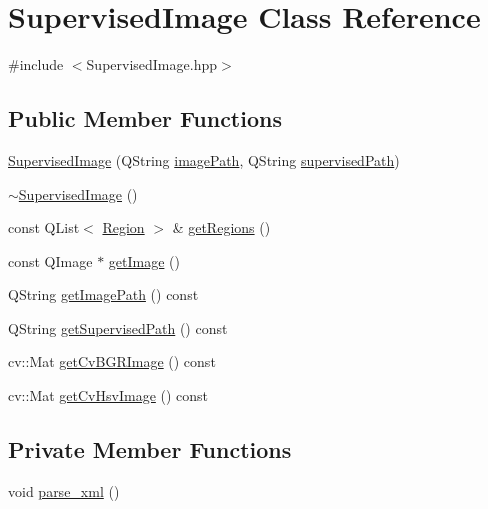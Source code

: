 \hypertarget{class_supervised_image}{\section{Supervised\+Image Class Reference}
\label{class_supervised_image}
}


{\ttfamily \#include $<$Supervised\+Image.\+hpp$>$}

\subsection*{Public Member Functions}
\begin{DoxyCompactItemize}
\item 
\hyperlink{class_supervised_image_a032c9ef022d741cfb65c683ed11029ed}{Supervised\+Image} (Q\+String \hyperlink{class_supervised_image_a39f8b0212d2dae489d7b060b0d8dd1b9}{image\+Path}, Q\+String \hyperlink{class_supervised_image_aeeb634f3804dffba600e6aea71fc353e}{supervised\+Path})
\item 
\hyperlink{class_supervised_image_a4e9cb98175c10635ff6b4aedb578d70e}{$\sim$\+Supervised\+Image} ()
\item 
const Q\+List$<$ \hyperlink{class_region}{Region} $>$ \& \hyperlink{class_supervised_image_a19120479bf06cc96df0eb2aea5f0e205}{get\+Regions} ()
\item 
const Q\+Image $\ast$ \hyperlink{class_supervised_image_a0a87d87ce7a8f21f5269f29e0d637290}{get\+Image} ()
\item 
Q\+String \hyperlink{class_supervised_image_af3c35e83075edcb7ca58bd708b198a4b}{get\+Image\+Path} () const 
\item 
Q\+String \hyperlink{class_supervised_image_a7accd41406835fc82dbeaf783ab2acaf}{get\+Supervised\+Path} () const 
\item 
cv\+::\+Mat \hyperlink{class_supervised_image_a5e9e136e057baf0cfde7b68da86e8030}{get\+Cv\+B\+G\+R\+Image} () const 
\item 
cv\+::\+Mat \hyperlink{class_supervised_image_a4e366821ce1f63006768966a4199bb76}{get\+Cv\+Hsv\+Image} () const 
\end{DoxyCompactItemize}
\subsection*{Private Member Functions}
\begin{DoxyCompactItemize}
\item 
void \hyperlink{class_supervised_image_ae351771d19a2bbd53c88e871ed5bb4de}{parse\+\_\+xml} ()
\end{DoxyCompactItemize}
